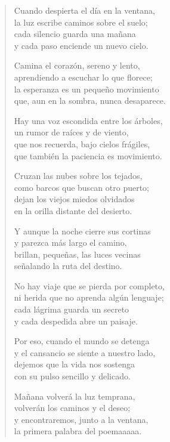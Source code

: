 \begin{verse}
Cuando despierta el día en la ventana,\\
la luz escribe caminos sobre el suelo;\\
cada silencio guarda una mañana\\
y cada paso enciende un nuevo cielo.

Camina el corazón, sereno y lento,\\
aprendiendo a escuchar lo que florece;\\
la esperanza es un pequeño movimiento\\
que, aun en la sombra, nunca desaparece.

Hay una voz escondida entre los árboles,\\
un rumor de raíces y de viento,\\
que nos recuerda, bajo cielos frágiles,\\
que también la paciencia es movimiento.

Cruzan las nubes sobre los tejados,\\
como barcos que buscan otro puerto;\\
dejan los viejos miedos olvidados\\
en la orilla distante del desierto.

Y aunque la noche cierre sus cortinas\\
y parezca más largo el camino,\\
brillan, pequeñas, las luces vecinas\\
señalando la ruta del destino.

No hay viaje que se pierda por completo,\\
ni herida que no aprenda algún lenguaje;\\
cada lágrima guarda un secreto\\
y cada despedida abre un paisaje.

Por eso, cuando el mundo se detenga\\
y el cansancio se siente a nuestro lado,\\
dejemos que la vida nos sostenga\\
con su pulso sencillo y delicado.

Mañana volverá la luz temprana,\\
volverán los caminos y el deseo;\\
y encontraremos, junto a la ventana,\\
la primera palabra del poemaaaaa.
\end{verse}
